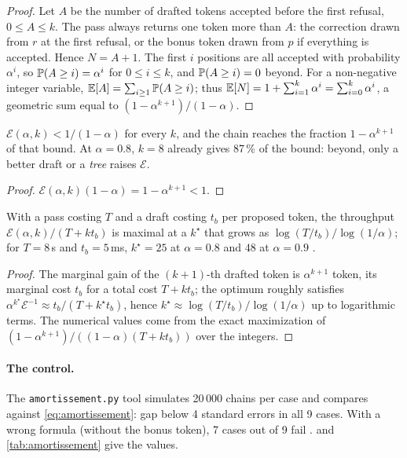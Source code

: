 \begin{proof}
Let $A$ be the number of drafted tokens accepted before the first refusal, $0 \le A \le k$. The pass always returns one token more than $A$: the correction drawn from $r$ at the first refusal, or the bonus token drawn from $p$ if everything is accepted. Hence $N = A + 1$. The first $i$ positions are all accepted with probability $\alpha^i$, so $\mathbb{P}(A \ge i) = \alpha^i$ for $0 \le i \le k$, and $\mathbb{P}(A \ge i) = 0$ beyond. For a non-negative integer variable, $\mathbb{E}[A] = \sum_{i \ge 1} \mathbb{P}(A \ge i)$; thus $\mathbb{E}[N] = 1 + \sum_{i=1}^{k} \alpha^i = \sum_{i=0}^{k} \alpha^i$, a geometric sum equal to $(1 - \alpha^{k+1})/(1-\alpha)$.
\end{proof}

\begin{corollaire}\label{cor:borne-chaine}
$\mathcal E(\alpha, k) < 1/(1 - \alpha)$ for every $k$, and the chain reaches the fraction $1 - \alpha^{k+1}$ of that bound. At $\alpha = 0.8$, $k = 8$ already gives 87\,\% of the bound: beyond, only a better draft or a \emph{tree} raises $\mathcal E$.
\end{corollaire}

\begin{proof}
$\mathcal E(\alpha,k) (1-\alpha) = 1 - \alpha^{k+1} < 1$.
\end{proof}

\begin{corollaire}\label{cor:k-optimal}
With a pass costing $T$ and a draft costing $t_b$ per proposed token, the throughput $\mathcal E(\alpha,k)/(T + k t_b)$ is maximal at a $k^\star$ that grows as $\log(T/t_b)/\log(1/\alpha)$; for $T = 8$\,s and $t_b = 5$\,ms, $k^\star = 25$ at $\alpha = 0.8$ and $48$ at $\alpha = 0.9$ \calc.
\end{corollaire}

\begin{proof}
The marginal gain of the $(k{+}1)$-th drafted token is $\alpha^{k+1}$ token, its marginal cost $t_b$ for a total cost $T + kt_b$; the optimum roughly satisfies $\alpha^{k^\star} \mathcal E^{-1} \approx t_b/(T + k^\star t_b)$, hence $k^\star \approx \log(T/t_b)/\log(1/\alpha)$ up to logarithmic terms. The numerical values come from the exact maximization of $(1-\alpha^{k+1})/((1-\alpha)(T + kt_b))$ over the integers.
\end{proof}

\paragraph{The control.} The \texttt{amortissement.py} tool simulates 20\,000 chains per case and compares against \cref{eq:amortissement}: gap below 4 standard errors in all 9 cases. With a wrong formula (without the bonus token), 7 cases out of 9 fail \mes.  and \cref{tab:amortissement} give the values.

